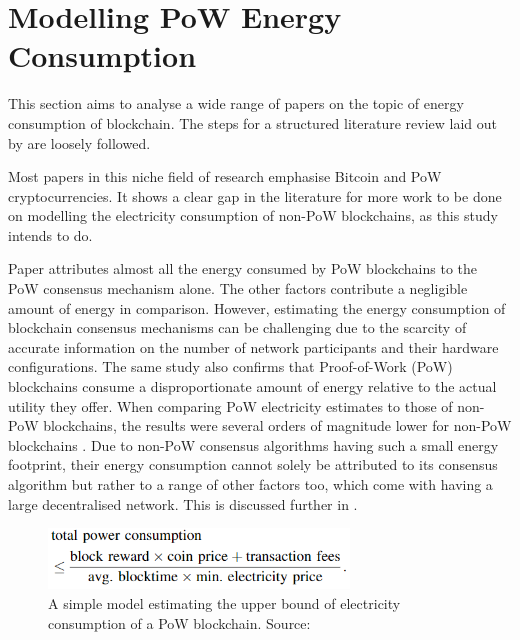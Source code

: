 


\section{Modelling PoW Energy Consumption}

This section aims to analyse a wide range of papers on the topic of energy consumption of blockchain. The steps for a structured literature review laid out by \cite{Crosby2015BlockChainBitcoin} are loosely followed. 

Most papers in this niche field of research emphasise Bitcoin and PoW cryptocurrencies. It shows a clear gap in the literature for more work to be done on modelling the electricity consumption of non-PoW blockchains, as this study intends to do.

Paper \cite{Sedlmeir2020TheMyth} attributes almost all the energy consumed by PoW blockchains to the PoW consensus mechanism alone. The other factors contribute a negligible amount of energy in comparison. However, estimating the energy consumption of blockchain consensus mechanisms can be challenging due to the scarcity of accurate information on the number of network participants and their hardware configurations. The same study also confirms that Proof-of-Work (PoW) blockchains consume a disproportionate amount of energy relative to the actual utility they offer. When comparing PoW electricity estimates to those of non-PoW blockchains, the results were several orders of magnitude lower for non-PoW blockchains \cite{Sedlmeir2020TheMyth}. Due to non-PoW consensus algorithms having such a small energy footprint, their energy consumption cannot solely be attributed to its consensus algorithm but rather to a range of other factors too, which come with having a large decentralised network. This is discussed further in . 

\begin{figure}[h]
    \centering
    \includegraphics[width=8cm,center]{Figures/SimplePoWModel.png}
    \caption{A simple model estimating the upper bound of electricity consumption of a PoW blockchain. Source: \cite{Sedlmeir2020TheMyth} }
    \label{Figure:SimplePoWModel}
\end{figure}

